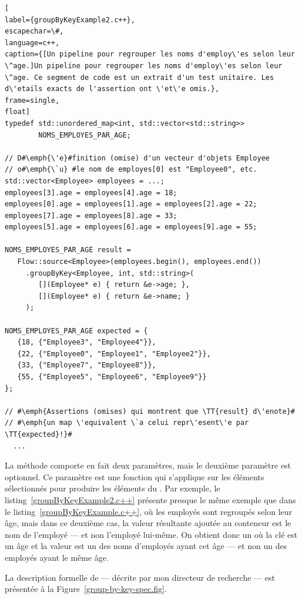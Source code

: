 \begin{lstlisting}[
label={groupByKeyExample2.c++},
escapechar=\#,
language=c++,
caption={[Un pipeline pour regrouper les noms d'employ\'es selon leur \^age.]Un pipeline pour regrouper les noms d'employ\'es selon leur \^age. Ce segment de code est un extrait d'un test unitaire. Les d\'etails exacts de l'assertion ont \'et\'e omis.},
frame=single,
float]
typedef std::unordered_map<int, std::vector<std::string>> 
        NOMS_EMPLOYES_PAR_AGE;

// D#\emph{\'e}#finition (omise) d'un vecteur d'objets Employee 
// o#\emph{\`u} #le nom de employes[0] est "Employee0", etc.
std::vector<Employee> employees = ...; 
employees[3].age = employees[4].age = 18;
employees[0].age = employees[1].age = employees[2].age = 22;
employees[7].age = employees[8].age = 33;
employees[5].age = employees[6].age = employees[9].age = 55;

NOMS_EMPLOYES_PAR_AGE result = 
   Flow::source<Employee>(employees.begin(), employees.end())
     .groupByKey<Employee, int, std::string>(
        [](Employee* e) { return &e->age; },
        [](Employee* e) { return &e->name; }
     );
    
NOMS_EMPLOYES_PAR_AGE expected = {
   {18, {"Employee3", "Employee4"}},
   {22, {"Employee0", "Employee1", "Employee2"}},
   {33, {"Employee7", "Employee8"}},
   {55, {"Employee5", "Employee6", "Employee9"}}
};

// #\emph{Assertions (omises) qui montrent que \TT{result} d\'enote}#
// #\emph{un map \'equivalent \`a celui repr\'esent\'e par \TT{expected}!}#
  ...
\end{lstlisting}


La m\'ethode  comporte en fait deux param\`etres, mais le deuxi\`eme param\`etre est optionnel. Ce param\`etre est une fonction qui s'applique sur les \'el\'ements s\'electionn\'es pour produire les \'el\'ements du . Par exemple,  le listing~\ref{groupByKeyExample2.c++} pr\'esente presque le m\^eme exemple que dans le listing~\ref{groupByKeyExample.c++}, o\`u les employ\'es sont regroup\'es selon leur \^age, mais dans ce deuxi\`eme cas, la valeur r\'esultante ajout\'ee au conteneur est le nom de l'employ\'e --- et non l'employ\'e lui-m\^eme. On obtient donc un  o\`u la cl\'e est un \^age et la valeur est un  des noms d'employ\'es ayant cet \^age --- et non un  des employ\'es ayant le m\^eme \^age.


La description formelle de  --- d\'ecrite par mon directeur de recherche --- est pr\'esent\'ee \`a la Figure~\ref{group-by-key-spec.fig}.

